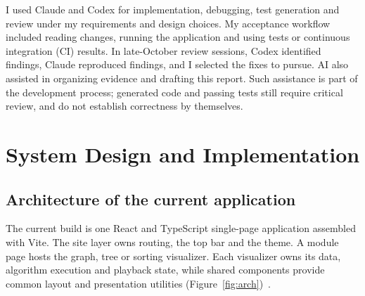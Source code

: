 \documentclass[11pt,a4paper]{article}
\newcommand{\page}{\par\Needspace{5\baselineskip}\vspace{6pt}}
\begin{document}
I used Claude and Codex for implementation, debugging, test generation and review under my requirements and design choices. My acceptance workflow included reading changes, running the application and using tests or continuous integration (CI) results. In late-October review sessions, Codex identified findings, Claude reproduced findings, and I selected the fixes to pursue. AI also assisted in organizing evidence and drafting this report. Such assistance is part of the development process; generated code and passing tests still require critical review, and do not establish correctness by themselves.

\page
\section{System Design and Implementation}
\subsection{Architecture of the current application}
The current build is one React and TypeScript single-page application assembled with Vite. The site layer owns routing, the top bar and the theme. A module page hosts the graph, tree or sorting visualizer. Each visualizer owns its data, algorithm execution and playback state, while shared components provide common layout and presentation utilities (Figure~\ref{fig:arch})~\cite{architecture}.
\end{document}
